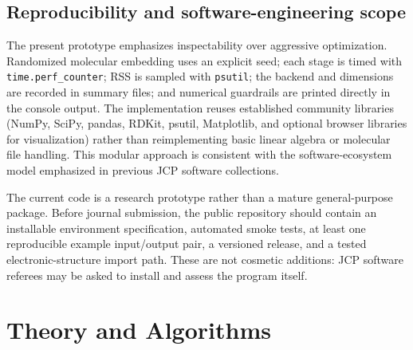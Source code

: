 \documentclass[aip,jcp,reprint,amsmath,amssymb,floatfix]{revtex4-2}
\begin{document}
\subsection{Reproducibility and software-engineering scope}
The present prototype emphasizes inspectability over aggressive optimization. Randomized molecular embedding uses an explicit seed; each stage is timed with \texttt{time.perf\_counter}; RSS is sampled with \texttt{psutil}; the backend and dimensions are recorded in summary files; and numerical guardrails are printed directly in the console output. The implementation reuses established community libraries (NumPy, SciPy, pandas, RDKit, psutil, Matplotlib, and optional browser libraries for visualization) rather than reimplementing basic linear algebra or molecular file handling. This modular approach is consistent with the software-ecosystem model emphasized in previous JCP software collections.\cite{Sherrill2020Software,Sherrill2021Software}

The current code is a research prototype rather than a mature general-purpose package. Before journal submission, the public repository should contain an installable environment specification, automated smoke tests, at least one reproducible example input/output pair, a versioned release, and a tested electronic-structure import path. These are not cosmetic additions: JCP software referees may be asked to install and assess the program itself.\cite{Sherrill2021Software}

\section{Theory and Algorithms}
\end{document}
